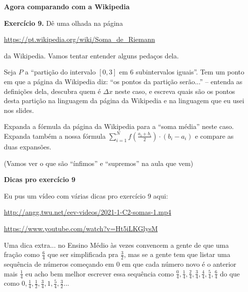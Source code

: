 \documentclass[oneside,12pt]{article}
\begin{document}
\newpage


{\bf Agora comparando com a Wikipedia}

\msk

{\bf Exercício 9.} Dê uma olhada na página

\ssk

\url{https://pt.wikipedia.org/wiki/Soma_de_Riemann}

\ssk

da Wikipedia. Vamos tentar entender alguns pedaços dela.

Seja $P$ a ``partição do intervalo $[0,3]$ em 6 subintervalos
iguais''. Tem um ponto em que a página da Wikipedia diz: ``os pontos
da partição serão...'' -- entenda as definições dela, descubra quem é
$Δx$ neste caso, e escreva quais são os pontos desta partição na
linguagem da página da Wikipedia e na linguagem que eu usei nos slides.

Expanda a fórmula da página da Wikipedia para a ``soma média'' neste
caso. Expanda também a nossa fórmula $\sum_{i=1}^N
f(\frac{a_i+b_i}{2})·(b_i-a_i)$ e compare as duas expansões.

\msk

(Vamos ver o que são ``ínfimos'' e ``supremos'' na aula que vem)

\newpage


{\bf Dicas pro exercício 9}

Eu pus um vídeo com várias dicas pro exercício 9 aqui:

\ssk


\url{http://angg.twu.net/eev-videos/2021-1-C2-somas-1.mp4}

\url{https://www.youtube.com/watch?v=Ht5iLKGlysM}

\msk

Uma dica extra... no Ensino Médio às vezes convencem a gente de que
uma fração como $\frac64$  que
ser simplificada pra $\frac32$, mas se a gente tem que listar uma
sequência de números começando em 0 em que cada número novo é o
anterior mais $\frac14$ eu acho bem melhor escrever essa sequência
como $\frac04, \frac14, \frac24, \frac34, \frac44, \frac54, \frac64$
do que como $0, \frac14, \frac12, \frac34, 1, \frac54, \frac32$...
\end{document}
